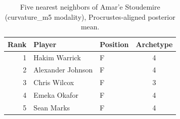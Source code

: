 \begin{table}[htbp]
  \centering\small
  \begin{tabular}{rllc}
    \toprule
    Rank & Player & Position & Archetype \\
    \midrule
    1 & Hakim Warrick & F & 4 \\
    2 & Alexander Johnson & F & 4 \\
    3 & Chris Wilcox & F & 3 \\
    4 & Emeka Okafor & F & 4 \\
    5 & Sean Marks & F & 4 \\
    \bottomrule
  \end{tabular}
  \caption{Five nearest neighbors of Amar'e Stoudemire (curvature_m5 modality), Procrustes-aligned posterior mean.}
  \label{tab:Amar_e_Stoudemire_neighbors_curvature_m5}
\end{table}

